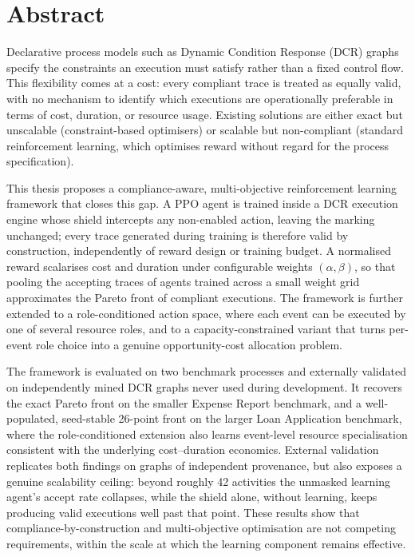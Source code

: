 \section*{Abstract}
Declarative process models such as Dynamic Condition Response (DCR)
graphs specify the constraints an execution must satisfy rather than a
fixed control flow. This flexibility comes at a cost: every compliant
trace is treated as equally valid, with no mechanism to identify which
executions are operationally preferable in terms of cost, duration, or
resource usage. Existing solutions are either exact but unscalable
(constraint-based optimisers) or scalable but non-compliant (standard
reinforcement learning, which optimises reward without regard for the
process specification).

This thesis proposes a compliance-aware, multi-objective reinforcement
learning framework that closes this gap. A \ac{PPO} agent is trained
inside a DCR execution engine whose shield intercepts any non-enabled
action, leaving the marking unchanged; every trace generated during
training is therefore valid by construction, independently of reward
design or training budget. A normalised reward scalarises cost and
duration under configurable weights $(\alpha,\beta)$, so that pooling
the accepting traces of agents trained across a small weight grid
approximates the Pareto front of compliant executions. The framework is
further extended to a role-conditioned action space, where each event
can be executed by one of several resource roles, and to a
capacity-constrained variant that turns per-event role choice into a
genuine opportunity-cost allocation problem.

The framework is evaluated on two benchmark processes and externally
validated on independently mined DCR graphs never used during
development. It recovers the exact Pareto front on the smaller Expense
Report benchmark, and a well-populated, seed-stable 26-point front on
the larger Loan Application benchmark, where the role-conditioned
extension also learns event-level resource specialisation consistent
with the underlying cost--duration economics. External validation
replicates both findings on graphs of independent provenance, but also
exposes a genuine scalability ceiling: beyond roughly 42 activities
the unmasked learning agent's accept rate collapses, while the
shield alone, without learning, keeps producing valid executions well
past that point. These results show that compliance-by-construction
and multi-objective optimisation are not competing requirements, within
the scale at which the learning component remains effective.
